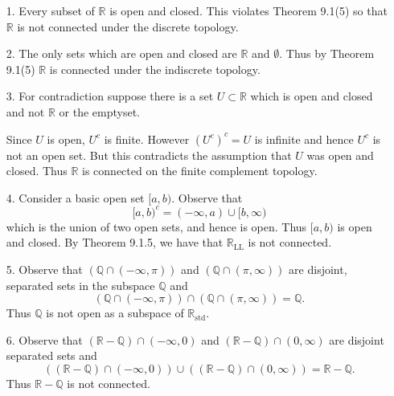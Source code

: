 \documentclass[a4paper,12pt,twoside]{hmcpset}
\begin{document}
\begin{solution}
    \begin{enumerate}
        \item[1.] Every subset of $\mathbb{R}$ is
        open and closed. This violates Theorem 9.1(5) so that $\mathbb{R}$
        is not connected under the discrete topology.
    
        \item[2.] The only sets which are open and closed are
        $\mathbb{R}$ and $\emptyset$. Thus by Theorem 9.1(5) $\mathbb{R}$
        is connected under the indiscrete topology.
    
        \item[3.] For contradiction suppose there is 
        a set $U \subset \mathbb{R}$ which is open and closed
        and not $\mathbb{R}$ or the emptyset.  
    
        Since $U$ is open, $U^c$ is finite. However $(U^c)^c = U$ is
        infinite and hence $U^c$ is not an open set. But this contradicts
        the assumption that $U$ was open and closed. Thus $\mathbb{R}$ is
        connected on the finite complement topology. 
    
        \item[4.] Consider a basic open set $[a, b)$. Observe that 
        \[
            [a, b)^c = (-\infty, a) \cup [b, \infty)
        \]  
        which is the union of two open sets, and hence is open. Thus $[a,
        b)$ is open and closed. By Theorem 9.1.5, we have that
        $\mathbb{R}_{\text{LL}}$ is not connected.
    
        \item[5.] Observe that $(\mathbb{Q} \cap (-\infty, \pi))$ and
        $(\mathbb{Q} \cap (\pi, \infty))$ are disjoint, separated sets in
        the subspace $\mathbb{Q}$ and 
        \[
            (\mathbb{Q} \cap (-\infty, \pi)) \cap (\mathbb{Q} \cap (\pi, \infty))
            = \mathbb{Q}.
        \] 
        Thus $\mathbb{Q}$ is not open as a subspace of $\mathbb{R}_{\text{std}}$.
        
        \item[6.] Observe that $(\mathbb{R} - \mathbb{Q}) \cap (-\infty,
        0)$ and $(\mathbb{R} - \mathbb{Q}) \cap (0, \infty)$ are disjoint
        separated sets and 
        \[
            ((\mathbb{R} - \mathbb{Q}) \cap (-\infty, 0)) \cup 
            ((\mathbb{R} - \mathbb{Q}) \cap (0, \infty)) = \mathbb{R} - \mathbb{Q}.
        \]   
        Thus $\mathbb{R} - \mathbb{Q}$ is not connected.
    \end{enumerate}
\end{solution}
\end{document}
